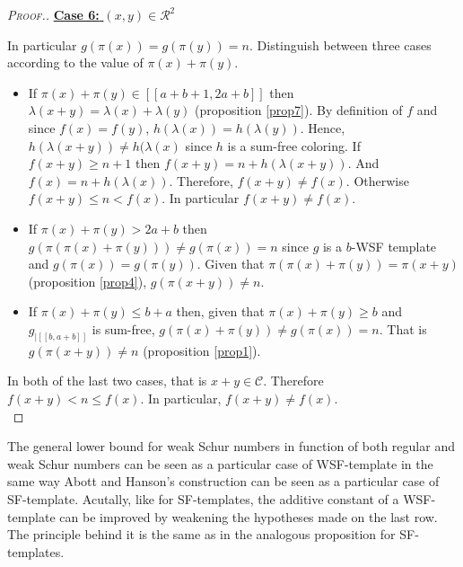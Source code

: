 \begin{proof}[\textsc{Proof.}]
\noindent \underline{\textbf{Case 6:} \((x,y) \in \mathcal{R}^2\)}
\par
In particular \(g(\pi(x)) = g(\pi(y))=n\). Distinguish between three cases according to the value of \(\pi(x) + \pi(y)\).
\begin{itemize}
\item If \(\pi(x) + \pi(y) \in [\![a + b + 1, 2 a + b]\!]\) then \(\lambda(x + y) = \lambda(x) + \lambda(y)\) 
	(proposition \ref{prop7}). By definition of \(f\) and since \(f(x) = f(y)\), \(h(\lambda(x)) = h(\lambda(y))\).
	Hence, \(h(\lambda(x + y)) \neq h(\lambda(x)\) since \(h\) is a sum-free coloring. If \(f(x+y) \geqslant n + 1\) 
	then \(f(x + y) = n + h(\lambda(x + y))\). And \(f(x) = n + h(\lambda(x))\). Therefore, \(f(x + y)  \neq f(x)\). 
	Otherwise \(f(x+y) \leqslant n < f(x)\). In particular \(f(x + y) \neq f(x)\).
\item If \(\pi(x)+\pi(y)>2a+b\) then \(g(\pi(\pi(x)+\pi(y))) \neq g(\pi(x)) = n\) since \(g\) is a \(b\)-WSF template and 
	\(g(\pi(x)) = g(\pi(y))\). Given that \(\pi(\pi(x)+\pi(y)) = \pi(x+y)\) (proposition \ref{prop4}), \(g(\pi(x+y)) \neq n\).
\item \begin{sloppypar}
	If \(\pi(x)+\pi(y)\leqslant b+a\) then, given that \(\pi(x)+\pi(y) \geqslant b\) and \(g_{| [\![b, a + b ]\!]}\) is 
	sum-free, \({g(\pi(x) + \pi(y)) \neq g(\pi(x)) = n}\). That is \(g(\pi(x + y)) \neq n\) (proposition \ref{prop1}).
	\end{sloppypar}
\end{itemize}
\par
In both of the last two cases, that is \(x+y \in \mathcal{C}\). Therefore \(f(x+y) < n \leqslant f(x)\). In particular, 
\(f(x + y) \neq f(x)\). \\
\end{proof}

The general lower bound for weak Schur numbers in function of both regular and weak Schur numbers can be seen as a particular
case of WSF-template in the same way Abott and Hanson's construction can be seen as a particular case of SF-template. Acutally,
like for SF-templates, the additive constant of a WSF-template can be improved by weakening the hypotheses made on
the last row. The principle behind it is the same as in the analogous proposition for SF-templates.

